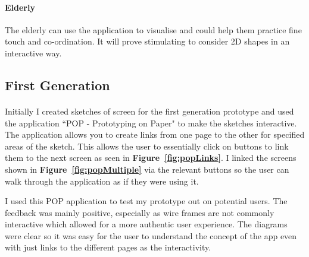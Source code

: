 \documentclass[11pt]{article}
\begin{document}
            \paragraph{Elderly}
            The elderly can use the application to visualise and could help them practice fine touch and co-ordination. It will prove stimulating to consider 2D shapes in an interactive way. 
            \clearpage
            
            \subsection{First Generation}
                    
                \paragraph{}
                Initially I created sketches of screen for the first generation prototype and used the application ``POP - Prototyping on Paper" \cite{POP} to make the sketches interactive. The application allows you to create links from one page to the other for specified areas of the sketch. This allows the user to essentially click on buttons to link them to the next screen as seen in \textbf{Figure~\ref{fig:popLinks}}. I linked the screens shown in  \textbf{Figure~\ref{fig:popMultiple}} via the relevant buttons so the user can walk through the application as if they were using it.
                
                I used this POP application to test my prototype out on potential users. The feedback was mainly positive, especially as wire frames are not commonly interactive which allowed for a more authentic user experience. The diagrams were clear so it was easy for the user to understand the concept of the app even with just links to the different pages as the interactivity.
                
\end{document}

